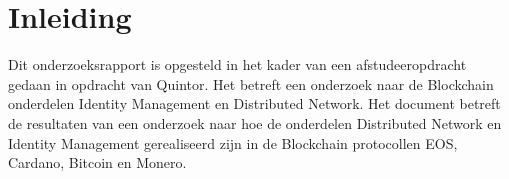 \newpage
\chapter{Inleiding}

Dit onderzoeksrapport is opgesteld in het kader van een afstudeeropdracht gedaan in opdracht van Quintor. Het betreft een onderzoek naar de Blockchain onderdelen Identity Management en Distributed Network. Het document betreft de resultaten van een onderzoek naar hoe de onderdelen Distributed Network en Identity Management gerealiseerd zijn in de Blockchain protocollen EOS, Cardano, Bitcoin en Monero.
